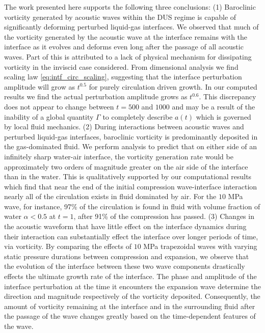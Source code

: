 The work presented here supports the following three conclusions:%
%
(1) Baroclinic vorticity generated by acoustic waves within the
\ac{DUS} regime is capable of significantly deforming perturbed
liquid-gas interfaces. We observed that much of the vorticity
generated by the acoustic wave at the interface remains with the
interface as it evolves and deforms even long after the passage of all
acoustic waves. Part of this is attributed to a lack of physical
mechanism for dissipating vorticity in the inviscid case
considered. From dimensional analysis we find scaling law
\eqref{eq:intf_circ_scaling}, suggesting that the interface
perturbation amplitude will grow as $t^{0.5}$ for purely circulation
driven growth. In our computed results we find the actual perturbation
amplitude grows as $t^{0.6}$. This discrepancy does not appear to
change between $t=500$ and $1000$ and may be a result of the inability
of a global quantity $\Gamma$ to completely describe $a(t)$ which is
governed by local fluid mechanics.
%
(2) During interactions between acoustic waves and perturbed
liquid-gas interfaces, baroclinic vorticity is predominantly deposited
in the gas-dominated fluid. We perform analysis to predict that on either
side of an infinitely sharp water-air interface, the vorticity
generation rate would be approximately two orders of magnitude greater
on the air side of the interface than in the water. This is
qualitatively supported by our computational results which find that
near the end of the initial compression wave-interface interaction
nearly all of the circulation exists in fluid dominated by air. For
the $10$ MPa wave, for instance, 97\% of the circulation is found in
fluid with volume fraction of water $\alpha<0.5$ at $t=1$, after 91\%
of the compression has passed.
%
(3) Changes in the acoustic waveform that have little effect on the
interface dynamics during their interaction can substantially effect
the interface over longer periods of time, via vorticity. By comparing
the effects of $10$ MPa trapezoidal waves with varying static pressure
durations between compression and expansion, we observe that the
evolution of the interface between these two wave components
drastically effects the ultimate growth rate of the interface. The
phase and amplitude of the interface perturbation at the time it
encounters the expansion wave determine the direction and magnitude
respectively of the vorticity deposited. Consequently, the amount of
vorticity remaining at the interface and in the surrounding fluid
after the passage of the wave changes greatly based on the
time-dependent features of the wave.

